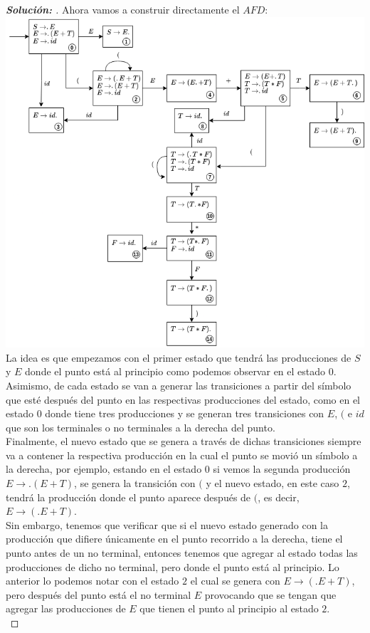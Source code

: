 \documentclass{article}
\begin{document}
\begin{enumerate}
\begin{enumerate}
\begin{proof}[\textbf{Solución: }]
            Ahora vamos a construir directamente el $AFD$: \\
            
            \includegraphics[scale=0.5]{Ej1AFD.png} \\

            La idea es que empezamos con el primer estado que tendrá las producciones de $S$ y $E$ donde el punto está al principio como podemos observar en el estado $0$. Asimismo, de cada estado se van a generar las transiciones a partir del símbolo que esté después del punto en las respectivas producciones del estado, como en el estado $0$ donde tiene tres producciones y se generan tres transiciones con $E$, $($ e $id$ que son los terminales o no terminales a la derecha del punto. \\
            
            Finalmente, el nuevo estado que se genera a través de dichas transiciones siempre va a contener la respectiva producción en la cual el punto se movió un símbolo a la derecha, por ejemplo, estando en el estado $0$ si vemos la segunda producción $E \rightarrow .(E+T)$, se genera la transición con $($ y el nuevo estado, en este caso $2$, tendrá la producción donde el punto aparece después de $($, es decir, $E \rightarrow (.E+T)$. \\

            Sin embargo, tenemos que verificar que si el nuevo estado generado con la producción que difiere únicamente en el punto recorrido a la derecha, tiene el punto antes de un no terminal, entonces tenemos que agregar al estado todas las producciones de dicho no terminal, pero donde el punto está al principio. Lo anterior lo podemos notar con el estado $2$ el cual se genera con $E \rightarrow (.E+T)$, pero después del punto está el no terminal $E$ provocando que se tengan que agregar las producciones de $E$ que tienen el punto al principio al estado $2$. \\


\end{proof}
\end{enumerate}
\end{enumerate}
\end{document}
